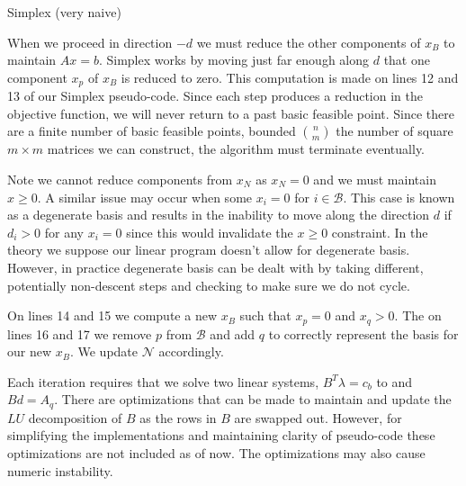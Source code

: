 \documentclass[12pt]{amsart}
\begin{document}
\begin{algorithm}
\LinesNumbered
\DontPrintSemicolon
{}
\caption{Simplex (very naive)}
\end{algorithm}

When we proceed in direction $-d$ we must
reduce the other components of $x_B$ to maintain $Ax=b$. Simplex works
by moving just far enough along $d$ that one component $x_p$ of $x_B$ is reduced
to zero. This computation is made on lines 12 and 13 of our Simplex pseudo-code.
Since each step produces a reduction in the objective function, we will never
return to a past basic feasible point. Since there are a finite number of
basic feasible points, bounded $\binom{n}{m}$ the number of square $m\times m$
matrices we can construct, the algorithm must terminate eventually. 

Note we cannot reduce
components from $x_N$ as $x_N=0$ and we must maintain
$x\ge 0$. A similar issue may occur when some $x_i=0$ for $i\in\mathcal{B}$.
This case is known as a degenerate basis and results in the inability to move
along the direction $d$ if $d_i>0$ for any $x_i=0$ since this would invalidate
the $x\ge 0$ constraint. In the theory we suppose our linear program doesn't
allow for degenerate basis. However, in practice degenerate basis can be dealt
with by taking different, potentially non-descent steps and checking to make
sure we do not cycle. 

On lines 14 and 15 we compute a new $x_B$ such that $x_p=0$ and $x_q>0$. The on
lines 16 and 17 we remove $p$
from $\mathcal{B}$ and add $q$ to correctly
represent the basis for our new $x_B$. We update $\mathcal{N}$ accordingly.

Each iteration requires that we solve two linear systems, $B^T\lambda = c_b$ to
and $Bd=A_q$. There are optimizations that can be made to maintain and update
the $LU$ decomposition of $B$ as the rows in $B$ are swapped out. However, for
simplifying the implementations and maintaining clarity of pseudo-code
these optimizations are not included as of now. The optimizations may also
cause numeric instability.
\end{document}

